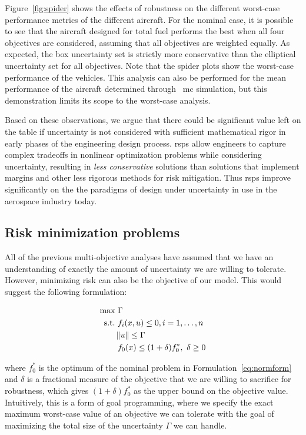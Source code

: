 Figure~\ref{fig:spider} shows the effects of robustness on
the different worst-case performance metrics of the different aircraft.
For the nominal case, it is possible to see that
the aircraft designed for total fuel performs the best when all four objectives are considered,
assuming that all objectives are weighted equally. As expected,
the box uncertainty set is strictly more conservative than the elliptical uncertainty set for
all objectives. Note that the spider plots show the worst-case performance of the vehicles.
This analysis can also be performed for the mean performance
of the aircraft determined through ~\gls{mc} simulation, but this demonstration limits
its scope to the worst-case analysis.

Based on these observations, we argue that there could be significant value left on the table
if uncertainty is not considered with sufficient mathematical rigor in early phases of
the engineering design process. \gls{rsp}s allow engineers to capture complex
tradeoffs in nonlinear optimization problems while considering uncertainty,
resulting in \emph{less conservative} solutions
than solutions that implement margins and other less rigorous methods for risk mitigation.
Thus \gls{rsp}s improve significantly on the
the paradigms of design under uncertainty in use
in the aerospace industry today.

\subsection{Risk minimization problems}

All of the previous multi-objective analyses have assumed that we have an
understanding of exactly the amount of uncertainty we are
willing to tolerate. However, minimizing risk can also be the objective of our
model. This would suggest the following formulation:

\begin{align}
    \begin{split}
    \text{max} &~\Gamma \\
    \text{s.t.}     &~f_i(x,u) \leq 0, i = 1,\ldots,n \\
                    & \left\lVert u\right\rVert \leq \Gamma \\
                    &~f_0(x) \leq (1+\delta)f_0^*,~\delta \geq 0
    \end{split}
    \label{eq:goalprogramming}
\end{align}

where $f_0^*$ is the optimum of the nominal problem in Formulation~\ref{eq:normform} and $\delta$
is a fractional measure of the objective that we are willing to sacrifice for robustness, which
gives $(1+\delta)f_0^*$ as the upper bound on the objective value. Intuitively,
this is a form of goal programming,
where we specify the exact maximum worst-case value of an objective we can tolerate with
the goal of maximizing the total size of the uncertainty $\Gamma$ we can handle.

